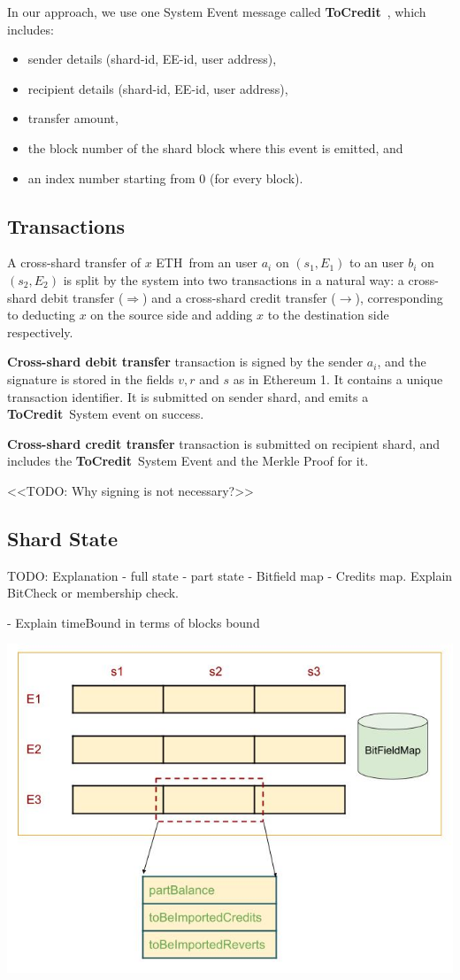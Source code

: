 \documentclass{article}
\newcommand{\eth}[0]{ETH~}
\newcommand{\tocredit}[0]{{\bf ToCredit}~}
\begin{document}
In our approach, we use one System Event message called \tocredit, which includes:
\begin{itemize}
\item sender details (shard-id, EE-id, user address), 
\item recipient details (shard-id, EE-id, user address), 
\item transfer amount, 
\item the block number of the shard block where this event is emitted, and 
\item an index number starting from 0 (for every block).
\end{itemize}

\subsection{Transactions}

A cross-shard transfer of $x$ \eth from an user $a_i$ on $(s_1,E_1)$ to an user $b_i$ on $(s_2,E_2)$ is split by the system into two transactions in a natural way: a cross-shard debit transfer ($\Longrightarrow$) and a cross-shard credit transfer ($\longrightarrow$), corresponding to deducting $x$ on the source side and adding $x$ to the destination side respectively. 

{\bf Cross-shard debit transfer} transaction is signed by the sender $a_i$, and the signature is stored in the fields $v, r$ and $s$ as in Ethereum 1. It contains a unique transaction identifier. It is submitted on sender shard, and emits a \tocredit System event on success.

{\bf Cross-shard credit transfer} transaction is submitted on recipient shard, and includes the \tocredit System Event and the Merkle Proof for it.

<<TODO: Why signing is not necessary?>>

\subsection{Shard State}
TODO: Explanation
- full state
- part state
- Bitfield map - Credits map. Explain BitCheck or membership check.
  
- Explain timeBound in terms of blocks bound

\includegraphics[scale=0.5]{state.jpg}
\end{document}

